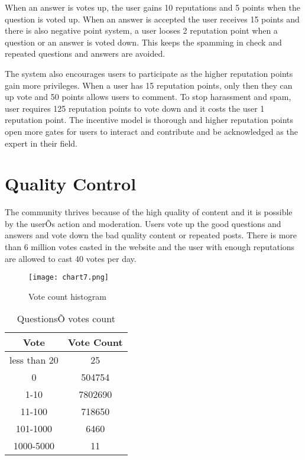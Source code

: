 When an answer is votes up, the user gains 10 reputations and 5 points when the question is voted up. When an answer is accepted the user receives 15 points and there is also negative point system, a user looses 2 reputation point when a question or an answer is voted down. This keeps the spamming in check and repeated questions and answers are avoided.

The system also encourages users to participate as the higher reputation points gain more privileges. When a user has 15 reputation points, only then they can up vote and 50 points allows users to comment. To stop harassment and spam, user requires 125 reputation points to vote down and it costs the user 1 reputation point. The incentive model is thorough and higher reputation points open more gates for users to interact and contribute and be acknowledged as the expert in their field.


\section{Quality Control}

The community thrives because of the high quality of content and it is possible by the userÕs action and moderation. Users vote up the good questions and answers and vote down the bad quality content or repeated posts. There is more than 6 million votes casted in the website and the user with enough reputations are allowed to cast 40 votes per day.

\begin{figure}[!htb]
  \centering
  \texttt{[image: chart7.png]}
  \caption{Vote count histogram}
  \label{Figure:figex4j}
\end{figure}

\begin{table}[!htb]
  \centering
  \begin{tabular}{cc}
  \toprule
  \textbf{Vote} & \textbf{Vote Count}\\  \midrule
  less than 20 & 25\\  \midrule
  0 & 504754\\  \midrule
  1-10 & 7802690\\  \midrule
  11-100 & 718650\\  \midrule
  101-1000 & 6460\\  \midrule
  1000-5000 &11\\
  \bottomrule
  \end{tabular}
  \caption{QuestionsÕ votes count}
  \label{Table:tabex4}
\end{table}

